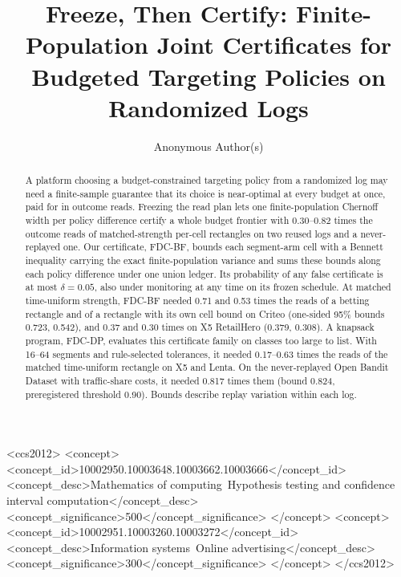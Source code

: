 \documentclass[sigconf,anonymous,review]{acmart}
\begin{document}
\title{Freeze, Then Certify: Finite-Population Joint Certificates for Budgeted Targeting Policies on Randomized Logs}

\author{Anonymous Author(s)}

\begin{abstract}
A platform choosing a budget-constrained targeting policy from a randomized log may need a finite-sample guarantee that its choice is near-optimal at every budget at once, paid for in outcome reads. Freezing the read plan lets one finite-population Chernoff width per policy difference certify a whole budget frontier with 0.30--0.82 times the outcome reads of matched-strength per-cell rectangles on two reused logs and a never-replayed one. Our certificate, FDC-BF, bounds each segment-arm cell with a Bennett inequality carrying the exact finite-population variance and sums these bounds along each policy difference under one union ledger. Its probability of any false certificate is at most $\delta = 0.05$, also under monitoring at any time on its frozen schedule. At matched time-uniform strength, FDC-BF needed 0.71 and 0.53 times the reads of a betting rectangle and of a rectangle with its own cell bound on Criteo (one-sided 95\% bounds 0.723, 0.542), and 0.37 and 0.30 times on X5 RetailHero (0.379, 0.308). A knapsack program, FDC-DP, evaluates this certificate family on classes too large to list. With 16--64 segments and rule-selected tolerances, it needed 0.17--0.63 times the reads of the matched time-uniform rectangle on X5 and Lenta. On the never-replayed Open Bandit Dataset with traffic-share costs, it needed 0.817 times them (bound 0.824, preregistered threshold 0.90). Bounds describe replay variation within each log.
\end{abstract}

\begin{CCSXML}
<ccs2012>
 <concept>
  <concept_id>10002950.10003648.10003662.10003666</concept_id>
  <concept_desc>Mathematics of computing~Hypothesis testing and confidence interval computation</concept_desc>
  <concept_significance>500</concept_significance>
 </concept>
 <concept>
  <concept_id>10002951.10003260.10003272</concept_id>
  <concept_desc>Information systems~Online advertising</concept_desc>
  <concept_significance>300</concept_significance>
 </concept>
</ccs2012>
\end{CCSXML}
\end{document}
